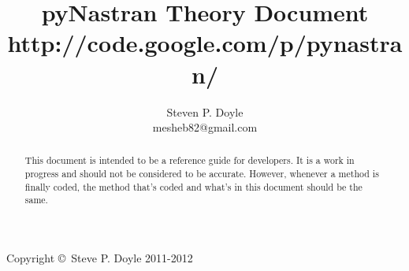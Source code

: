 \documentclass[a4paper,12pt]{article}
\begin{document}
\title{pyNastran Theory Document \\
\small http://code.google.com/p/pynastran/ }
\author{Steven P. Doyle\\
{\small mesheb82@gmail.com}
}

\maketitle

\begin{abstract}
This document is intended to be a reference guide for developers.  It is a work in progress and should not be considered to be accurate.  However, whenever a method is finally coded, the method that's coded and what's in this document should be the same.
\end{abstract}

Copyright \copyright\ Steve P. Doyle 2011-2012
\newpage

\tableofcontents
\newpage


\newpage








%
%
\end{document}
